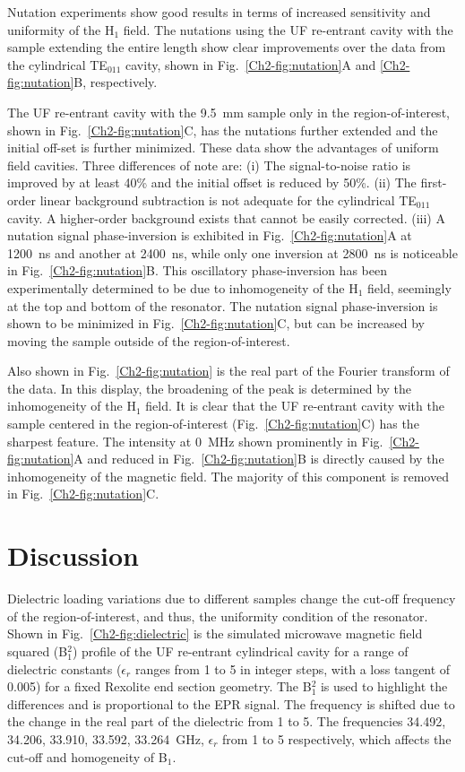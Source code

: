 Nutation experiments show good results in terms of increased sensitivity and uniformity of the H$_1$ field. The nutations using the UF re-entrant \cylTE{} cavity with the sample extending the entire length show clear improvements over the data from the cylindrical TE$_{011}$ cavity, shown in Fig.~\ref{Ch2-fig:nutation}A and \ref{Ch2-fig:nutation}B, respectively. 

The UF re-entrant \cylTE{} cavity with the 9.5~mm sample only in the region-of-interest, shown in Fig.~\ref{Ch2-fig:nutation}C, has the nutations further extended and the initial off-set is further minimized. These data show the advantages of uniform field cavities. Three differences of note are: (i) The signal-to-noise ratio is improved by at least 40\% and the initial offset is reduced by 50\%. (ii) The first-order linear background subtraction is not adequate for the cylindrical TE$_{011}$ cavity. A higher-order background exists that cannot be easily corrected. (iii) A nutation signal phase-inversion is exhibited in  Fig.~\ref{Ch2-fig:nutation}A at 1200~ns and another at 2400~ns, while only one inversion at 2800~ns is noticeable in Fig.~\ref{Ch2-fig:nutation}B. This oscillatory phase-inversion has been experimentally determined to be due to inhomogeneity of the H$_1$ field, seemingly at the top and bottom of the resonator. The nutation signal phase-inversion is shown to be minimized in Fig.~\ref{Ch2-fig:nutation}C, but can be increased by moving the sample outside of the region-of-interest.

Also shown in Fig.~\ref{Ch2-fig:nutation} is the real part of the Fourier transform of the data. In this display, the broadening of the peak is determined by the inhomogeneity of the H$_1$ field. \cite{pulsejeschke} It is clear that the UF re-entrant \cylTE{} cavity with the sample centered in the region-of-interest (Fig.~\ref{Ch2-fig:nutation}C) has the sharpest feature. The intensity at 0~MHz shown prominently in Fig.~\ref{Ch2-fig:nutation}A and reduced in Fig.~\ref{Ch2-fig:nutation}B is directly caused by the inhomogeneity of the magnetic field. The majority of this component is removed in Fig.~\ref{Ch2-fig:nutation}C. 

\section{Discussion}

Dielectric loading variations due to different samples change the cut-off frequency of the region-of-interest, and thus, the uniformity condition of the resonator. Shown in Fig.~\ref{Ch2-fig:dielectric} is the simulated microwave magnetic field squared (B$^2_1$) profile of the UF re-entrant cylindrical \cylTE{} cavity for a range of dielectric constants ($\epsilon_r$ ranges from 1 to 5 in integer steps, with a loss tangent of 0.005) for a fixed Rexolite end section geometry. The B$^2_1$ is used to highlight the differences and is proportional to the EPR signal. The frequency is shifted due to the change in the real part of the dielectric from 1 to 5. The frequencies  34.492, 34.206, 33.910, 33.592, 33.264~GHz, $\epsilon_r$ from 1 to 5 respectively, which affects the cut-off and homogeneity of B$_1$. 

